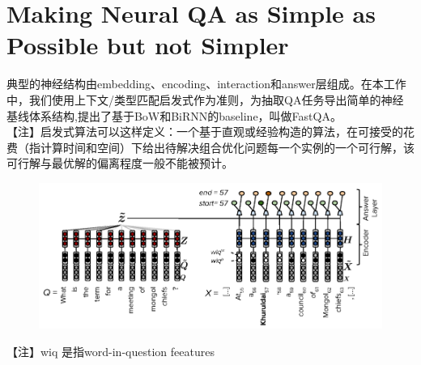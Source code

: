 \documentclass[a4paper,UTF8]{article}
\numberwithin{equation}{section}
\begin{document}
\section{Making Neural QA as Simple as Possible but not Simpler}
典型的神经结构由embedding、encoding、interaction和answer层组成。在本工作中，我们使用上下文/类型匹配启发式作为准则，为抽取QA任务导出简单的神经基线体系结构,提出了基于BoW和BiRNN的baseline，叫做FastQA。\\
【注】启发式算法可以这样定义：一个基于直观或经验构造的算法，在可接受的花费（指计算时间和空间）下给出待解决组合优化问题每一个实例的一个可行解，该可行解与最优解的偏离程度一般不能被预计。
\begin{figure}[H]
	\centering
	\includegraphics[width=\textwidth]{6-1.png}
\end{figure}
【注】wiq 是指word-in-question feeatures

\newpage
\end{document}
